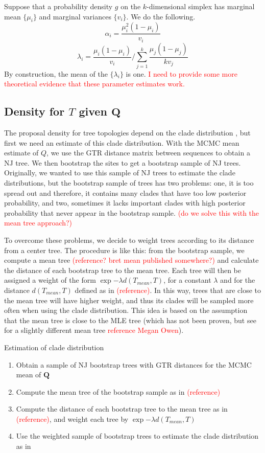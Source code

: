 \documentclass[conference]{IEEEtran}
\newcommand{\falta}[1]{\textcolor{red}{#1}}
\begin{document}
Suppose that a probability density $g$ on the $k$-dimensional simplex
has marginal mean $\{\mu_i\}$ and marginal variances $\{v_i\}$.  We do
the following.
$$
\alpha_i = \frac{\mu_i^2(1-\mu_i)}{v_i}
$$
$$
\lambda_i = \frac{\mu_i(1-\mu_i)}{v_i} \Bigg/ \sum_{j=1}^k \frac{\mu_j(1-\mu_j)}{kv_j}
$$
By construction, the mean of the $\{\lambda_i\}$ is one.
\falta{I need to provide some more theoretical evidence that these parameter estimates work.}


\subsection*{Density for $T$ given $\mathbf{Q}$}
The proposal density for tree topologies depend on the clade
distribution \citep{Larget2013}, but first we need an estimate of this
clade distribution. With the MCMC mean estimate of $Q$, we use the GTR
distance matrix between sequences to obtain a NJ tree. We then
bootstrap the sites to get a bootstrap sample of NJ trees. Originally,
we wanted to use this sample of NJ trees to estimate the clade
distributions, but the bootstrap sample of trees has two problems:
one, it is too spread out and therefore, it contains many clades that
have too low posterior probability, and two, sometimes it lacks
important clades with high posterior probability that never appear in
the bootstrap sample. \falta{(do we solve this with the mean tree
  approach?)}

To overcome these problems, we decide to weight trees according to its
distance from a center tree. The procedure is like this: from the
bootstrap sample, we compute a mean tree \falta{(reference? bret mean
  published somewhere?)} and calculate the distance of each bootstrap
tree to the mean tree. Each tree will then be assigned a weight of the
form $\exp{-\lambda d(T_{mean},T)}$, for a constant $\lambda$ and for
the distance $d(T_{mean},T)$ defined as in \falta{(reference)}. In
this way, trees that are close to the mean tree will have higher
weight, and thus its clades will be sampled more often when using the
clade distribution. This idea is based on the assumption that the mean
tree is close to the MLE tree (which has not been proven, but see for
a slightly different mean tree \falta{reference Megan Owen}).

\begin{algorithm}
\caption{Estimation of clade distribution}
\begin{enumerate}
\item{Obtain a sample of NJ bootstrap trees with GTR distances for the
    MCMC mean of $\mathbf{Q}$}
\item{Compute the mean tree of the bootstrap sample as in
    \falta{(reference)}}
\item{Compute the distance of each bootstrap tree to the mean tree as
    in \falta{(reference)}, and weight each tree by $\exp{-\lambda
      d(T_{mean},T)}$}
\item{Use the weighted sample of bootstrap trees to estimate the clade
    distribution as in \citep{Larget2013}}
\end{enumerate}
\end{algorithm}
\end{document}
